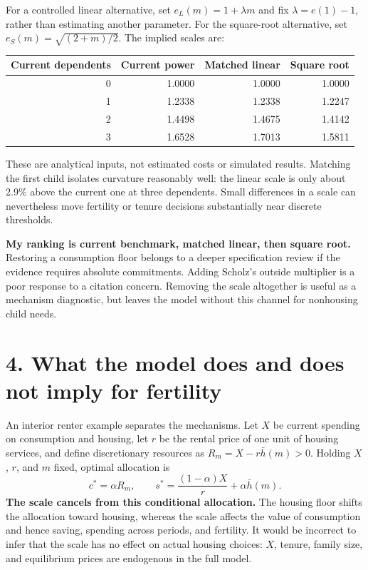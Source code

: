 \documentclass[11pt,letterpaper]{article}
\newcommand{\hh}{\bar h}
\newcommand{\page}[1]{\newpage\section*{#1}}
\begin{document}
For a controlled linear alternative, set $e_L(m)=1+\lambda m$ and fix $\lambda=e(1)-1$, rather than estimating another parameter. For the square-root alternative, set $e_S(m)=\sqrt{(2+m)/2}$. The implied scales are:
\begin{center}
\begin{tabular}{@{}rrrr@{}}
\toprule
Current dependents & Current power & Matched linear & Square root\\
\midrule
0 & 1.0000 & 1.0000 & 1.0000\\
1 & 1.2338 & 1.2338 & 1.2247\\
2 & 1.4498 & 1.4675 & 1.4142\\
3 & 1.6528 & 1.7013 & 1.5811\\
\bottomrule
\end{tabular}
\end{center}
These are analytical inputs, not estimated costs or simulated results. Matching the first child isolates curvature reasonably well: the linear scale is only about 2.9\% above the current one at three dependents. Small differences in a scale can nevertheless move fertility or tenure decisions substantially near discrete thresholds.

\textbf{My ranking is current benchmark, matched linear, then square root.} Restoring a consumption floor belongs to a deeper specification review if the evidence requires absolute commitments. Adding Scholz's outside multiplier is a poor response to a citation concern. Removing the scale altogether is useful as a mechanism diagnostic, but leaves the model without this channel for nonhousing child needs.

\page{4. What the model does and does not imply for fertility}
An interior renter example separates the mechanisms. Let $X$ be current spending on consumption and housing, let $r$ be the rental price of one unit of housing services, and define discretionary resources as $R_m=X-r\hh(m)>0$. Holding $X$, $r$, and $m$ fixed, optimal allocation is
\[
c^*=\alpha R_m,
\qquad
s^*=\frac{(1-\alpha)X}{r}+\alpha\hh(m).
\]
\textbf{The scale cancels from this conditional allocation.} The housing floor shifts the allocation toward housing, whereas the scale affects the value of consumption and hence saving, spending across periods, and fertility. It would be incorrect to infer that the scale has no effect on actual housing choices: $X$, tenure, family size, and equilibrium prices are endogenous in the full model.
\end{document}
